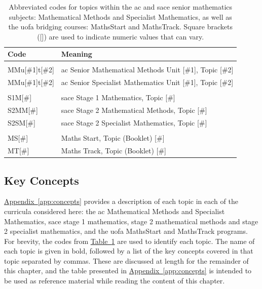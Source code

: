 \documentclass[twoside,12pt,a4paper]{report}
\newcommand{\reftab}[1]{\hyperref[tab:#1]{Table~\ref{tab:#1}}}
\newcommand{\refapp}[1]{\hyperref[app:#1]{Appendix~\ref{app:#1}}}
\begin{document}
\begin{table}[h]
\caption{Abbreviated codes for topics within the \gls{ac} and \gls{sace} senior mathematics subjects: Mathematical Methods and Specialist Mathematics, as well as the \gls{uofa} bridging courses: MathsStart and MathsTrack. Square brackets ([]) are used to indicate numeric values that can vary. \label{tab:notation}}
\begin{tabular}{ll}
Code & Meaning \\ \hline
 & \\
MMu[\#1]t[\#2] & \gls{ac} Senior Mathematical Methods Unit [\#1], Topic [\#2] \\
MMu[\#1]t[\#2] & \gls{ac} Senior Specialist Mathematics Unit [\#1], Topic [\#2] \\
 & \\
S1M[\#] & \gls{sace} Stage 1 Mathematics, Topic [\#] \\
S2MM[\#] & \gls{sace} Stage 2 Mathematical Methods, Topic [\#] \\
S2SM[\#] & \gls{sace} Stage 2 Specialist Mathematics, Topic [\#] \\
 & \\
MS[\#] & Maths Start, Topic (Booklet) [\#] \\
MT[\#] & Maths Track, Topic (Booklet) [\#]
\end{tabular}
\end{table}

\subsection{Key Concepts}

\refapp{concepts} provides a description of each topic in each of the curricula considered here: the \gls{ac} Mathematical Methods and Specialist Mathematics, \gls{sace} stage 1 mathematics, stage 2 mathematical methods and stage 2 specialist mathematics, and the \gls{uofa} MathsStart and MathsTrack programs. For brevity, the codes from \reftab{notation} are used to identify each topic. The name of each topic is given in bold, followed by a list of the key concepts covered in that topic separated by commas. These are discussed at length for the remainder of this chapter, and the table presented in \refapp{concepts} is intended to be used as reference material while reading the content of this chapter.
\end{document}
